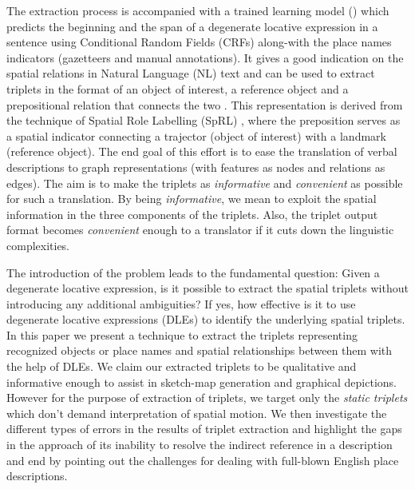 \documentclass{sig-alternate}
\begin{document}
The extraction process is accompanied with a trained learning model (\cite{fei:locative}) which predicts the beginning and the span of a degenerate locative expression in a sentence using Conditional Random Fields (CRFs) along-with the place names indicators (gazetteers and manual annotations). It gives a good indication on the spatial relations in Natural Language (NL) text and can be used to extract triplets in the format of an object of interest, a reference object and a prepositional relation that connects the two . This representation is derived from the technique of Spatial Role Labelling (SpRL) \cite{Kordjamshidi:labelling}, where the preposition serves as a spatial indicator connecting a trajector (object of interest) with a landmark (reference object). The end goal of this effort is to ease the translation of verbal descriptions to graph representations (with features as nodes and relations as edges). The aim is to make the triplets as \textit{informative} and \textit{convenient} as possible for such a translation. By being \textit{informative}, we mean to exploit the spatial information in the three components of the triplets. Also, the triplet output format becomes \textit{convenient} enough to a translator if it cuts down the linguistic complexities.

The introduction of the problem leads to the fundamental question: Given a degenerate locative expression, is it possible to extract the spatial triplets without introducing any additional ambiguities? If yes, how effective is it to use degenerate locative expressions (DLEs) to identify the underlying spatial triplets. In this paper we present a technique to extract the triplets representing recognized objects or place names and spatial relationships between them with the help of DLEs. We claim our extracted triplets to be qualitative and informative enough to assist in sketch-map generation and graphical depictions. However for the purpose of extraction of triplets, we target only the \textit{static triplets} which don't demand interpretation of spatial motion. We then investigate the different types of errors in the results of triplet extraction and highlight the gaps in the approach of its inability to resolve the indirect reference in a description and end by pointing out the challenges for dealing with full-blown English place descriptions.
\end{document}
